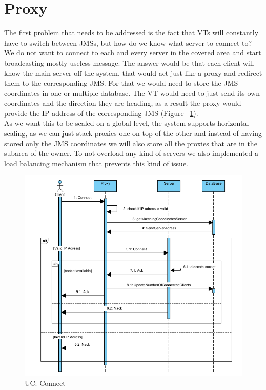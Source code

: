 \documentclass[17pt]{report}
\begin{document}
\section{Proxy}
\indent \indent
The first problem that needs to be addressed is the fact that VTs will 
constantly have to switch between JMSs, but how do we know what server to 
connect to? We do not want to connect to each and every server in the 
covered area and start broadcasting mostly useless message. The answer
would be that each client will know the main server off the system, that
would act just like a proxy and redirect them to the corresponding JMS.
For that we would need to store the JMS coordinates in one or multiple
database. The VT would need to just send its own coordinates and the
direction they are heading, as a result the proxy would provide the IP
address of the corresponding JMS (Figure ~\ref{fig:UC_Connect}).\\
\indent \indent
As we want this to be scaled on a global level, the system supports
horizontal scaling, as we can just stack proxies one on top of the 
other and instead of having stored only the JMS coordinates we 
will also store all the proxies that are in the subarea of the owner. To 
not overload any kind of servers we also implemented a load balancing
mechanism that prevents this kind of issue.
\begin{figure}[h!]
    \includegraphics[width=\textwidth]{UC/Connect.png}
    \caption{UC: Connect}
    \label{fig:UC_Connect}
\end{figure}
\end{document}
